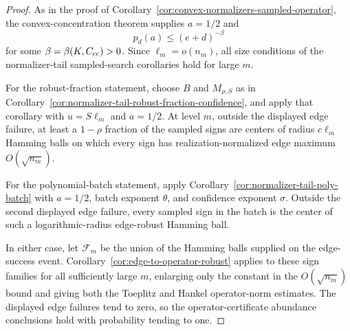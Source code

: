 \documentclass[11pt]{amsart}
\numberwithin{equation}{section}
\theoremstyle{definition}
\theoremstyle{remark}
\begin{document}
\begin{proof}
As in the proof of Corollary~\ref{cor:convex-normalizers-sampled-operator}, the
convex-concentration theorem supplies \(a=1/2\) and
\[
  p_d(a)\le (e+d)^{-\beta}
\]
for some \(\beta=\beta(K,C_{\rm cc})>0\).  Since \(\ell_m=o(n_m)\), all size
conditions of the normalizer-tail sampled-search corollaries hold for large
\(m\).

For the robust-fraction statement, choose \(B\) and \(M_{\rho,S}\) as in
Corollary~\ref{cor:normalizer-tail-robust-fraction-confidence}, and apply that
corollary with \(u=S\ell_m\) and \(a=1/2\).  At level \(m\), outside the
displayed edge failure, at least a \(1-\rho\) fraction of the sampled signs are
centers of radius \(c\ell_m\) Hamming balls on which every sign has
realization-normalized edge maximum \(O(\sqrt{n_m})\).

For the polynomial-batch statement, apply
Corollary~\ref{cor:normalizer-tail-poly-batch} with \(a=1/2\), batch exponent
\(\theta\), and confidence exponent \(\sigma\).  Outside the second displayed
edge failure, every sampled sign in the batch is the center of such a
logarithmic-radius edge-robust Hamming ball.

In either case, let \(\mathcal F_m\) be the union of the Hamming balls supplied
on the edge-success event.  Corollary~\ref{cor:edge-to-operator-robust} applies
to these sign families for all sufficiently large \(m\), enlarging only the
constant in the \(O(\sqrt{n_m})\) bound and giving both the Toeplitz and Hankel
operator-norm estimates.  The displayed edge failures tend to zero, so the
operator-certificate abundance conclusions hold with probability tending to
one.
\end{proof}
\end{document}
